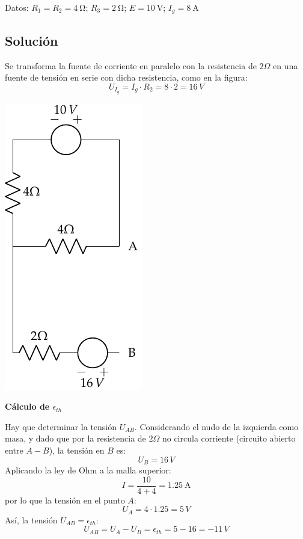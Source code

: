 Datos: $R_1 = R_2 = \qty{4}{\ohm}$; $R_3 = \qty{2}{\ohm}$; $E = \qty{10}{\volt}$; $I_g = \qty{8}{\ampere}$

\subsection*{Solución}
Se transforma la fuente de corriente en paralelo con la resistencia de
$2\Omega$ en una fuente de tensión en serie con dicha resistencia,
como en la figura:
\begin{equation*}
  U_{I_g}=I_g\cdot R_2=8\cdot 2=16\, V
\end{equation*}

\begin{center}
  \includegraphics{figuras/BT1_17_mallas.pdf}
\end{center}


\textbf{Cálculo de $\epsilon_{th}$}

Hay que determinar la tensión $U_{AB}$. Considerando el nudo de la
izquierda como masa, y dado que por la resistencia de $2\Omega$ no
circula corriente (circuito abierto entre $A-B$), la tensión en $B$
es:
\begin{equation*}
  U_B=16\,V
\end{equation*}
Aplicando la ley de Ohm a la malla superior:
\begin{equation*}
  I=\dfrac{10}{4+4}=\qty{1.25}{\ampere}
\end{equation*}
por lo que la tensión en el punto $A$:
\begin{equation*}
  U_A=4\cdot 1.25=5\,V
\end{equation*}
Así, la tensión $U_{AB}=\epsilon_{th}$:
\begin{equation*}
  U_{AB}=U_A-U_B=\epsilon_{th}=5-16=-11\,V
\end{equation*}

